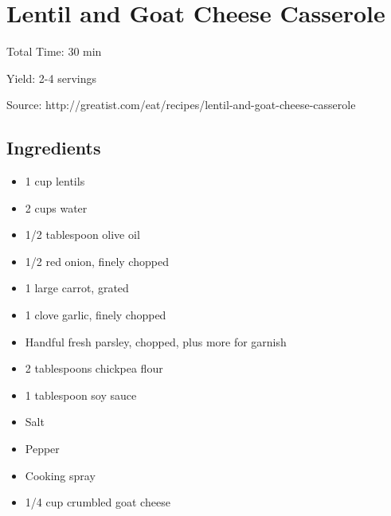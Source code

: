 \section{Lentil and Goat Cheese Casserole}

\begin{center}
Total Time: 30 min

\noindent Yield: 2-4 servings

\vspace{1em}

Source: http://greatist.com/eat/recipes/lentil-and-goat-cheese-casserole
\end{center}

\subsection{Ingredients}
\begin{multicols}{2}
\begin{itemize}
    \item 1 cup lentils
    \item 2 cups water
    \item 1/2 tablespoon olive oil
    \item 1/2 red onion, finely chopped
    \item 1 large carrot, grated
    \item 1 clove garlic, finely chopped
    \item Handful fresh parsley, chopped, plus more for garnish
    \item 2 tablespoons chickpea flour
    \item 1 tablespoon soy sauce
    \item Salt
    \item Pepper
    \item Cooking spray
    \item 1/4 cup crumbled goat cheese
\end{itemize}
\end{multicols}

